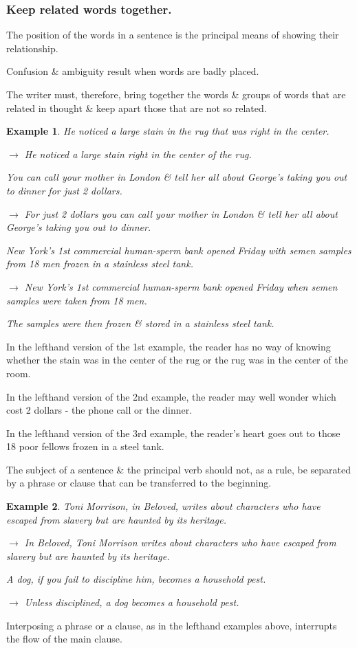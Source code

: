 \documentclass{article}
\newtheorem{example}{Example}
\begin{document}
\subsubsection{Keep related words together.}
The position of the words in a sentence is the principal means of showing their relationship.

Confusion \& ambiguity result when words are badly placed.

The writer must, therefore, bring together the words \& groups of words that are related in thought \& keep apart those that are not so related.
\begin{example}
	He noticed a large stain in the rug that was right in the center.
	
	$\to$ He noticed a large stain right in the center of the rug.
	
	You can call your mother in London \& tell her all about George's taking you out to dinner for just 2 dollars.
	
	$\to$ For just 2 dollars you can call your mother in London \& tell her all about George's taking you out to dinner.
	
	New York's 1st commercial human-sperm bank opened Friday with semen samples from 18 men frozen in a stainless steel tank.
	
	$\to$ New York's 1st commercial human-sperm bank opened Friday when semen samples were taken from 18 men.
	
	The samples were then frozen \& stored in a stainless steel tank.
\end{example}
In the lefthand version of the 1st example, the reader has no way of knowing whether the stain was in the center of the rug or the rug was in the center of the room.

In the lefthand version of the 2nd example, the reader may well wonder which cost 2 dollars - the phone call or the dinner.

In the lefthand version of the 3rd example, the reader's heart goes out to those 18 poor fellows frozen in a steel tank.

%
The subject of a sentence \& the principal verb should not, as a rule, be separated by a phrase or clause that can be transferred to the beginning.
\begin{example}
	Toni Morrison, in \emph{Beloved}, writes about characters who have escaped from slavery but are haunted by its heritage.
	
	$\to$ In \emph{Beloved}, Toni Morrison writes about characters who have escaped from slavery but are haunted by its heritage.
	
	A dog, if you fail to discipline him, becomes a household pest.
	
	$\to$ Unless disciplined, a dog becomes a household pest.
\end{example}
Interposing a phrase or a clause, as in the lefthand examples above, interrupts the flow of the main clause.
\end{document}

